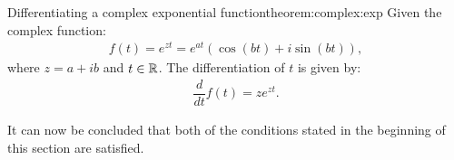 \begin{theorem}{Differentiating a complex exponential function}{theorem:complex:exp}
Given the complex function:
\begin{align*}
f(t)=e^{zt}=e^{at}(\cos(bt)+i\sin(bt)),
\end{align*}
where $z=a+ib$ and $t\in \mathbb{R}$. The differentiation of $t$ is given by:
\begin{align*}
\dfrac{d}{dt}f(t)=ze^{zt}.
\end{align*}
\end{theorem}



\noindent
It can now be concluded that both of the conditions stated in the beginning of this section are satisfied. 